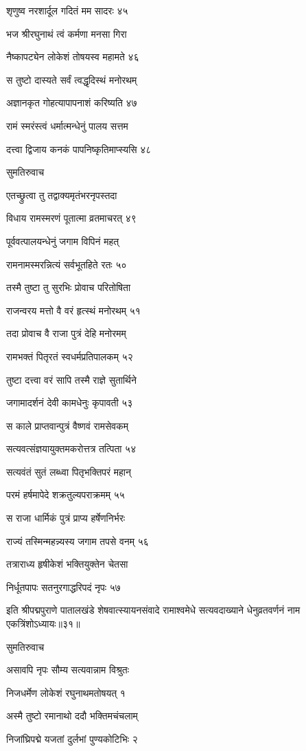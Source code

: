 शृणुष्व नरशार्दूल गदितं मम सादरः ४५

भज श्रीरघुनाथं त्वं कर्मणा मनसा गिरा

नैष्कापट्येन लोकेशं तोषयस्व महामते ४६

स तुष्टो दास्यते सर्वं त्वद्धृदिस्थं मनोरथम्

अज्ञानकृत गोहत्यापापनाशं करिष्यति ४७

रामं स्मरंस्त्वं धर्मात्मन्धेनुं पालय सत्तम

दत्त्वा द्विजाय कनकं पापनिष्कृतिमाप्स्यसि ४८

सुमतिरुवाच

एतच्छ्रुत्वा तु तद्वाक्यमृतंभरनृपस्तदा

विधाय रामस्मरणं पूतात्मा व्रतमाचरत् ४९

पूर्ववत्पालयन्धेनुं जगाम विपिनं महत्

रामनामस्मरन्नित्यं सर्वभूतहिते रतः ५०

तस्मै तुष्टा तु सुरभिः प्रोवाच परितोषिता

राजन्वरय मत्तो वै वरं हृत्स्थं मनोरथम् ५१

तदा प्रोवाच वै राजा पुत्रं देहि मनोरमम्

रामभक्तं पितृरतं स्वधर्मप्रतिपालकम् ५२

तुष्टा दत्त्वा वरं सापि तस्मै राज्ञे सुतार्थिने

जगामादर्शनं देवी कामधेनुः कृपावती ५३

स काले प्राप्तवान्पुत्रं वैष्णवं रामसेवकम्

सत्यवत्संज्ञयायुक्तमकरोत्तत्र तत्पिता ५४

सत्यवंतं सुतं लब्ध्वा पितृभक्तिपरं महान्

परमं हर्षमापेदे शक्रतुल्यपराक्रमम् ५५

स राजा धार्मिकं पुत्रं प्राप्य हर्षेणनिर्भरः

राज्यं तस्मिन्महन्न्यस्य जगाम तपसे वनम् ५६

तत्राराध्य हृषीकेशं भक्तियुक्तेन चेतसा

निर्धूतपापः सतनुरगाद्धरिपदं नृपः ५७

इति श्रीपद्मपुराणे पातालखंडे शेषवात्स्यायनसंवादे रामाश्वमेधे सत्यवदाख्याने धेनुव्रतवर्णनं नाम एकत्रिंशोऽध्यायः॥३१॥


सुमतिरुवाच

असावपि नृपः सौम्य सत्यवान्नाम विश्रुतः

निजधर्मेण लोकेशं रघुनाथमतोषयत् १

अस्मै तुष्टो रमानाथो ददौ भक्तिमचंचलाम्

निजांघ्रिपद्मे यजतां दुर्लभां पुण्यकोटिभिः २

